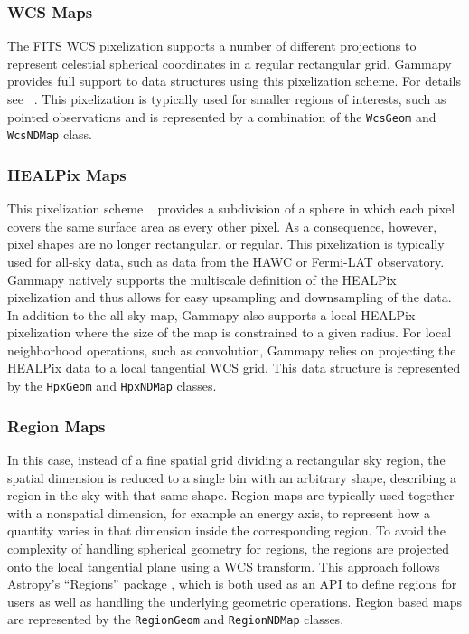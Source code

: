 \documentclass[longauth]{aa}
\newcommand{\code}[1]{\texttt{#1}}
\newcommand{\gammapy}{Gammapy\xspace}
\newcommand{\hawc}{HAWC\xspace}
\newcommand{\fermi}{Fermi-LAT\xspace}
\begin{document}
\subsubsection{WCS Maps}
The FITS WCS pixelization supports a number of different projections to
represent celestial spherical coordinates in a regular rectangular grid.
\gammapy provides full support to data structures using this pixelization
scheme. For details see ~\cite{Calabretta2002}. This pixelization
is typically used for smaller regions of interests, such as pointed
observations and is represented by a combination of the
\code{WcsGeom} and \code{WcsNDMap} class.


\subsubsection{HEALPix Maps}
This pixelization scheme ~\citep{Calabretta2002, Gorski2005} provides a
subdivision of a sphere in which each pixel covers the same surface area as
every other pixel. As a consequence, however, pixel shapes are no longer
rectangular, or regular.
This pixelization is typically used for all-sky data, such as data
from the \hawc or \fermi observatory. \gammapy natively supports
the multiscale definition of the HEALPix pixelization and thus
allows for easy upsampling and downsampling of the data. In addition to
the all-sky map, \gammapy also supports a local HEALPix
pixelization where the size of the map is constrained to a given
radius.
For local neighborhood operations, such as convolution, \gammapy relies
on projecting the HEALPix data to a local tangential WCS grid.
This data structure is represented by the \code{HpxGeom} and \code{HpxNDMap}
classes. 


\subsubsection{Region Maps}
In this case, instead of a fine spatial grid
dividing a rectangular sky region, the spatial dimension is reduced to a single
bin with an arbitrary shape, describing a region in the sky with that same
shape. Region maps are typically used together with a nonspatial dimension, for
example an energy axis, to represent how a quantity varies in that dimension
inside the corresponding region. To avoid the complexity of handling
spherical geometry for regions, the regions are projected onto the local
tangential plane using a WCS transform. This approach follows Astropy's \enquote{Regions}
package \citep{AstropyRegions2022}, which is both used as an API to define regions
for users as well as handling the underlying geometric operations. Region based
maps are represented by the \code{RegionGeom} and \code{RegionNDMap} classes.
\end{document}
